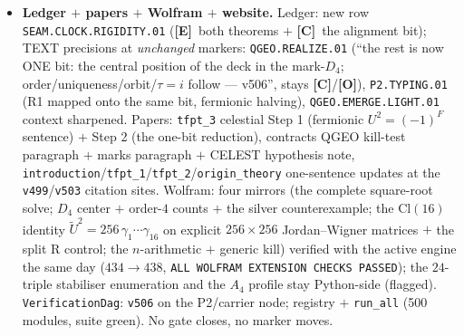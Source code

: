 \documentclass[11pt]{article}
\providecommand{\mE}{\textbf{[E]}}\providecommand{\mC}{\textbf{[C]}}
\providecommand{\mO}{\textbf{[O]}}\providecommand{\mX}{\textbf{[X]}}
\providecommand{\gcar}{g_{\mathrm{car}}}\providecommand{\Nfam}{N_{\mathrm{fam}}}
\begin{document}
\begin{itemize}[leftmargin=1.5em]
$\mathrm{Cl}(16)$): $\tilde U=\prod_j(1-\gamma_j\gamma_{j+8})$ implements the deck on all $16$
generators and $\tilde U^2=256\,\gamma_1\cdots\gamma_{16}$ $\Rightarrow$ $U^2=(-1)^F$ EXACTLY;
$(cU)^2=c^2(-1)^F$ is \emph{never} $1$ (center of $\mathrm{Cl}(16)$ $=$ scalars): the $\Z_4$ lift
is FORCED, $1\to\Z_2^{(-1)^F}\to\Z_4\to\Z_2^{\mathrm{deck}}\to1$ nonsplit; the quarter-shift lift
$V$ (unique even block implementer) has $V^2\propto\tilde U$, $V^4\propto(-1)^F$, projective order
$8=2|\mu_4|$ --- the \texttt{v492} $\Z_8$ spin bridge realised on the $16$-Majorana Fock space;
R control $U_R^2=+1$ (split --- the forcing rests on NS $=$ established geometry); $16$-fold way
$\theta_v=1$ at $\nu=16$; robustness: the forcing already holds at $8$ sites ($16$ $=$ the carrier
count $2^{\gcar-1}$, not a tuning). \emph{The one \mC\ rest (verbatim)}: ``the collar deck is the
central involution of the mark-$D_4$'' ($\iff$ square-root existence on the mark data) --- ONE
alignment bit; the fermionic $\Z_4$ forces the ORDER, not the spatial alignment. No overclaim.
\item \textbf{Ledger $+$ papers $+$ Wolfram $+$ website.} Ledger: new row
\texttt{SEAM.CLOCK.RIGIDITY.01} (\mE\ both theorems $+$ \mC\ the alignment bit); TEXT precisions at
\emph{unchanged} markers: \texttt{QGEO.REALIZE.01} (``the rest is now ONE bit: the central position
of the deck in the mark-$D_4$; order/uniqueness/orbit/$\tau{=}i$ follow --- v506'', stays \mC/\mO),
\texttt{P2.TYPING.01} (R1 mapped onto the same bit, fermionic halving), \texttt{QGEO.EMERGE.LIGHT.01}
context sharpened. Papers: \texttt{tfpt\_3} celestial Step 1 (fermionic $U^2=(-1)^F$ sentence) $+$
Step 2 (the one-bit reduction), contracts QGEO kill-test paragraph $+$ marks paragraph $+$ CELEST
hypothesis note, \texttt{introduction}/\texttt{tfpt\_1}/\texttt{tfpt\_2}/\texttt{origin\_theory}
one-sentence updates at the \texttt{v499}/\texttt{v503} citation sites. Wolfram: four mirrors (the
complete square-root solve; $D_4$ center $+$ order-$4$ counts $+$ the silver counterexample; the
$\mathrm{Cl}(16)$ identity $\tilde U^2=256\,\gamma_1\cdots\gamma_{16}$ on explicit $256{\times}256$
Jordan--Wigner matrices $+$ the split R control; the $n$-arithmetic $+$ generic kill) verified with
the active engine the same day ($434\to438$, \texttt{ALL WOLFRAM EXTENSION CHECKS PASSED}); the
$24$-triple stabiliser enumeration and the $A_4$ profile stay Python-side (flagged).
\texttt{VerificationDag}: \texttt{v506} on the P2/carrier node; registry $+$ \texttt{run\_all}
(500 modules, suite green). No gate closes, no marker moves.
\end{itemize}
\end{document}
